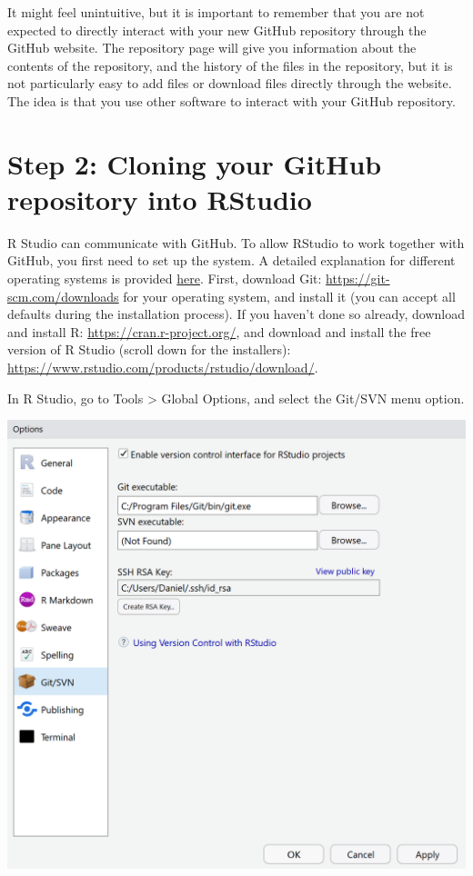 \documentclass[
  oneside]{krantz}
\begin{document}
It might feel unintuitive, but it is important to remember that you are not
expected to directly interact with your new GitHub repository through the GitHub
website. The repository page will give you information about the contents of the
repository, and the history of the files in the repository, but it is not
particularly easy to add files or download files directly through the website.
The idea is that you use other software to interact with your GitHub repository.

\hypertarget{step-2-cloning-your-github-repository-into-rstudio}{%
\section{Step 2: Cloning your GitHub repository into RStudio}\label{step-2-cloning-your-github-repository-into-rstudio}}

R Studio can communicate with GitHub. To allow RStudio to work together with
GitHub, you first need to set up the system. A detailed explanation for
different operating systems is provided
\href{https://support.rstudio.com/hc/en-us/articles/200532077-Version-Control-with-Git-and-SVN}{here}.
First, download Git: \url{https://git-scm.com/downloads} for your operating system,
and install it (you can accept all defaults during the installation process). If
you haven't done so already, download and install R:
\url{https://cran.r-project.org/}, and download and install the free version of R
Studio (scroll down for the installers):
\url{https://www.rstudio.com/products/rstudio/download/}.

In R Studio, go to Tools \textgreater{} Global Options, and select the Git/SVN menu option.

\begin{center}\includegraphics[width=1\linewidth]{images/cfc1e6fc415fb90fad16f4856338b890} \end{center}
\end{document}

